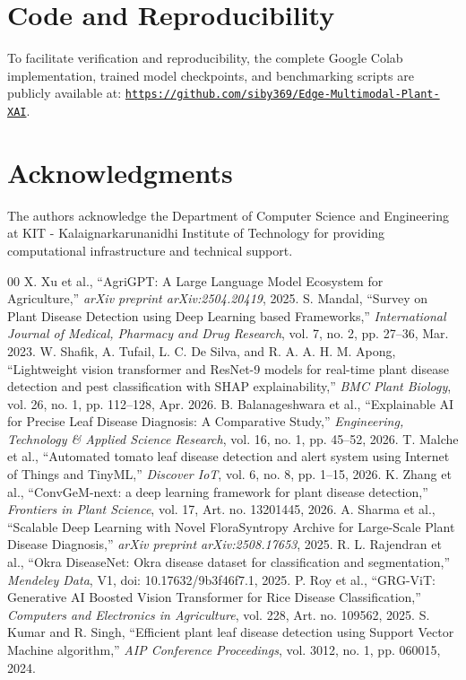 \documentclass[conference]{IEEEtran}
\begin{document}
\section*{Code and Reproducibility}
To facilitate verification and reproducibility, the complete Google Colab implementation, trained model checkpoints, and benchmarking scripts are publicly available at: \href{https://github.com/siby369/Edge-Multimodal-Plant-XAI}{\nolinkurl{https://github.com/siby369/Edge-Multimodal-Plant-XAI}}.

\section*{Acknowledgments}
The authors acknowledge the Department of Computer Science and Engineering at KIT - Kalaignarkarunanidhi Institute of Technology for providing computational infrastructure and technical support.

\begin{thebibliography}{00}
 X. Xu et al., ``AgriGPT: A Large Language Model Ecosystem for Agriculture,'' \textit{arXiv preprint arXiv:2504.20419}, 2025.
 S. Mandal, ``Survey on Plant Disease Detection using Deep Learning based Frameworks,'' \textit{International Journal of Medical, Pharmacy and Drug Research}, vol. 7, no. 2, pp. 27--36, Mar. 2023.
 W. Shafik, A. Tufail, L. C. De Silva, and R. A. A. H. M. Apong, ``Lightweight vision transformer and ResNet-9 models for real-time plant disease detection and pest classification with SHAP explainability,'' \textit{BMC Plant Biology}, vol. 26, no. 1, pp. 112--128, Apr. 2026.
 B. Balanageshwara et al., ``Explainable AI for Precise Leaf Disease Diagnosis: A Comparative Study,'' \textit{Engineering, Technology \& Applied Science Research}, vol. 16, no. 1, pp. 45--52, 2026.
 T. Malche et al., ``Automated tomato leaf disease detection and alert system using Internet of Things and TinyML,'' \textit{Discover IoT}, vol. 6, no. 8, pp. 1--15, 2026.
 K. Zhang et al., ``ConvGeM-next: a deep learning framework for plant disease detection,'' \textit{Frontiers in Plant Science}, vol. 17, Art. no. 13201445, 2026.
 A. Sharma et al., ``Scalable Deep Learning with Novel FloraSyntropy Archive for Large-Scale Plant Disease Diagnosis,'' \textit{arXiv preprint arXiv:2508.17653}, 2025.
 R. L. Rajendran et al., ``Okra DiseaseNet: Okra disease dataset for classification and segmentation,'' \textit{Mendeley Data}, V1, doi: 10.17632/9b3f46f7.1, 2025.
 P. Roy et al., ``GRG-ViT: Generative AI Boosted Vision Transformer for Rice Disease Classification,'' \textit{Computers and Electronics in Agriculture}, vol. 228, Art. no. 109562, 2025.
 S. Kumar and R. Singh, ``Efficient plant leaf disease detection using Support Vector Machine algorithm,'' \textit{AIP Conference Proceedings}, vol. 3012, no. 1, pp. 060015, 2024.
\end{thebibliography}
\end{document}
